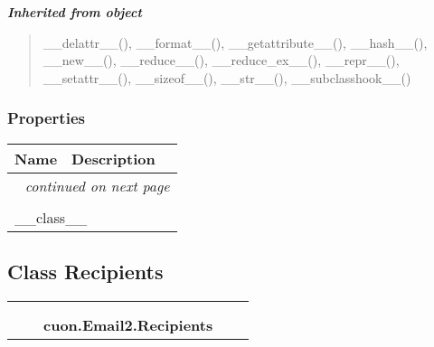 \large{\textbf{\textit{Inherited from object}}}

\begin{quote}
\_\_delattr\_\_(), \_\_format\_\_(), \_\_getattribute\_\_(), \_\_hash\_\_(), \_\_new\_\_(), \_\_reduce\_\_(), \_\_reduce\_ex\_\_(), \_\_repr\_\_(), \_\_setattr\_\_(), \_\_sizeof\_\_(), \_\_str\_\_(), \_\_subclasshook\_\_()
\end{quote}


  \subsubsection{Properties}

    \vspace{-1cm}
\hspace{\varindent}\begin{longtable}{|p{\varnamewidth}|p{\vardescrwidth}|l}
\cline{1-2}
\cline{1-2} \centering \textbf{Name} & \centering \textbf{Description}& \\
\cline{1-2}
\endhead\cline{1-2}\multicolumn{3}{r}{\small\textit{continued on next page}}\\\endfoot\cline{1-2}
\endlastfoot\multicolumn{2}{|l|}{\textit{Inherited from object}}\\
\multicolumn{2}{|p{\varwidth}|}{\raggedright \_\_class\_\_}\\
\cline{1-2}
\end{longtable}



\subsection{Class Recipients}

    \label{cuon:Email2:Recipients}
\begin{tabular}{cccccc}
\multicolumn{2}{r}{\settowidth{\BCL}{object}\multirow{2}{\BCL}{object}}
&&
  \\\cline{3-3}
  &&\multicolumn{1}{c|}{}
&&
  \\
&&\multicolumn{2}{l}{\textbf{cuon.Email2.Recipients}}
\end{tabular}

